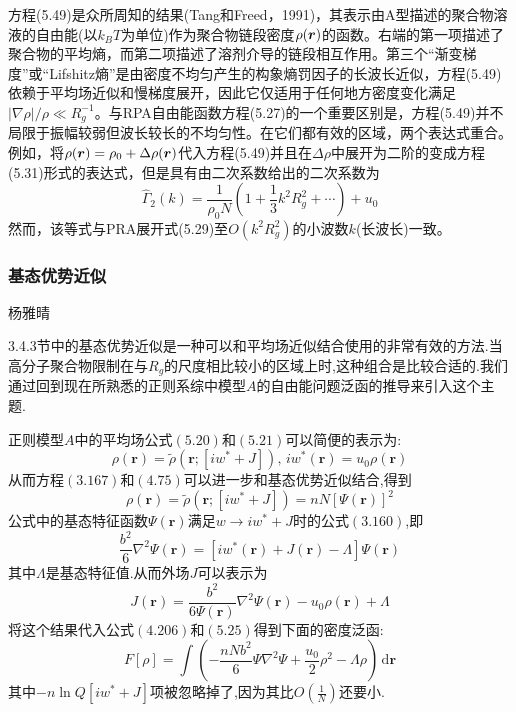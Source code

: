 方程(5.49)是众所周知的结果(Tang和Freed，1991)，其表示由A型描述的聚合物溶液的自由能(以$k_BT$为单位)作为聚合物链段密度$\rho(\bm{r})$的函数。右端的第一项描述了聚合物的平均熵，而第二项描述了溶剂介导的链段相互作用。第三个“渐变梯度”或“Lifshitz熵”是由密度不均匀产生的构象熵罚因子的长波长近似，方程(5.49)依赖于平均场近似和慢梯度展开，因此它仅适用于任何地方密度变化满足$\left|\nabla\rho\right|/\rho\ll R_g^{-1}$。与RPA自由能函数方程(5.27)的一个重要区别是，方程(5.49)并不局限于振幅较弱但波长较长的不均匀性。在它们都有效的区域，两个表达式重合。例如，将$\rho(\bm{r})=\rho_0+\Delta\rho(\bm{r})$代入方程(5.49)并且在$\Delta\rho$中展开为二阶的变成方程(5.31)形式的表达式，但是具有由二次系数给出的二次系数为
\begin{equation}
\hat{\Gamma}_2(k)=\frac{1}{\rho_0N}\left(1+\frac{1}{3}k^2R_g^2+\cdots\right)+u_0
\end{equation}
然而，该等式与PRA展开式(5.29)至$O(k^2R_g^2)$的小波数$k$(长波长)一致。

\subsubsection{基态优势近似}
\begin{center}
	杨雅晴
\end{center}

3.4.3节中的基态优势近似是一种可以和平均场近似结合使用的非常有效的方法.当高分子聚合物限制在与$R_g$的尺度相比较小的区域上时,这种组合是比较合适的.我们通过回到现在所熟悉的正则系综中模型$A$的自由能问题泛函的推导来引入这个主题.

正则模型$A$中的平均场公式$(5.20)$和$(5.21)$可以简便的表示为:
\begin{equation}
\rho(\mathbf{r}) = \tilde{\rho}(\mathbf{r};[iw^*+J]),\,iw^*(\mathbf{r}) = u_0 \rho(\mathbf{r})
\end{equation}
从而方程$(3.167)$和$(4.75)$可以进一步和基态优势近似结合,得到
\begin{equation}
\rho(\mathbf{r}) = \tilde{\rho}(\mathbf{r};[iw^*+J]) = nN[\Psi(\mathbf{r})]^2
\end{equation}
公式中的基态特征函数$\Psi(\mathbf{r})$满足$w \rightarrow iw^*+J$时的公式$(3.160)$,即
\begin{equation}
\frac{b^2}{6} {\nabla}^2 \Psi(\mathbf{r}) = [iw^*(\mathbf{r})+J(\mathbf{r})-\Lambda]\Psi(\mathbf{r})
\end{equation}
其中$\Lambda$是基态特征值.从而外场$J$可以表示为
\begin{equation}
J(\mathbf{r}) = \frac{b^2}{6 \Psi(\mathbf{r})} \nabla^2 \Psi(\mathbf{r}) - u_0 \rho(\mathbf{r}) + \Lambda
\end{equation}
将这个结果代入公式$(4.206)$和$(5.25)$得到下面的密度泛函:
\begin{equation}
F[\rho] = \int (-\frac{nNb^2}{6}\Psi\nabla^2\Psi+\frac{u_0}{2}\rho^2-\Lambda\rho)\,\mathrm{d}\mathbf{r}
\end{equation}
其中$-n\ln Q[iw^*+J]$项被忽略掉了,因为其比$O(\frac{1}{N})$还要小.

